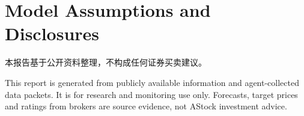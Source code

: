 \documentclass[a4paper,11pt,openany,fontset=none]{ctexrep}
\newcommand{\reportdisclaimer}{本报告基于公开资料整理，不构成任何证券买卖建议。}
\begin{document}
\chapter{Model Assumptions and Disclosures}


\clearpage
\thispagestyle{empty}
\vspace*{4cm}
\begin{disclosurebox}[Disclaimer]
\small
\reportdisclaimer\par
This report is generated from publicly available information and agent-collected data packets. It is for research and monitoring use only. Forecasts, target prices and ratings from brokers are source evidence, not AStock investment advice.
\end{disclosurebox}
\end{document}
